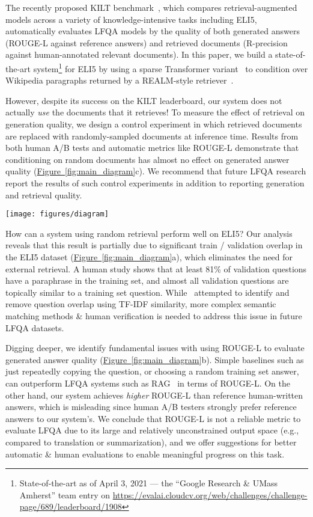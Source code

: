 \documentclass[11pt]{article}
\newcommand{\namedref}[2]{\hyperref[#2]{#1~\ref*{#2}}}
\newcommand{\figureref}[1]{\namedref{Figure}{#1}}
\begin{document}
The recently proposed KILT benchmark~\citep{petroni2020kilt}, which compares retrieval-augmented models across a variety of knowledge-intensive tasks including ELI5, automatically evaluates LFQA models by the quality of both generated answers (ROUGE-L against reference answers) and retrieved documents (R-precision against human-annotated relevant documents). In this paper, we build a state-of-the-art system\footnote{State-of-the-art as of April 3, 2021 --- the ``Google Research \& UMass Amherst'' team entry on \small{\url{https://evalai.cloudcv.org/web/challenges/challenge-page/689/leaderboard/1908}}} for ELI5 by using a sparse Transformer variant~\citep{roy2020efficient} to condition over Wikipedia paragraphs returned by a REALM-style retriever~\citep{guu2020realm}.

However, despite its success on the KILT leaderboard, our system does not actually \emph{use} the documents that it retrieves! To measure the effect of retrieval on generation quality, we design a control experiment in which retrieved documents are replaced with randomly-sampled documents at inference time. Results from both human A/B tests and automatic metrics like ROUGE-L demonstrate that conditioning on random documents has almost no effect on generated answer quality (\figureref{fig:main_diagram}c). We recommend that future LFQA research report the results of such control experiments in addition to reporting generation and retrieval quality.

\begin{figure*}[t]
\texttt{[image: figures/diagram]}
\caption{A summary of the major hurdles (a-d) to progress in long-form question answering with ELI5.}
\label{fig:main_diagram}
\end{figure*}

How can a system using random retrieval perform well on ELI5? Our analysis reveals that this result is partially due to significant train / validation overlap in the ELI5 dataset (\figureref{fig:main_diagram}a), which eliminates the need for external retrieval. A human study shows that at least 81\% of validation questions have a paraphrase in the training set, and almost all validation questions are topically similar to a training set question. While~\citet{fan-etal-2019-eli5} attempted to identify and remove question overlap using TF-IDF similarity, more complex semantic matching methods \& human verification is needed to address this issue in future LFQA datasets.

Digging deeper, we identify fundamental issues with using ROUGE-L to evaluate generated answer quality (\figureref{fig:main_diagram}b). Simple baselines such as just repeatedly copying the question, or choosing a random training set answer, can outperform  LFQA systems such as RAG~\citep{lewis2020retrieval} in terms of ROUGE-L. On the other hand, our system achieves \emph{higher} ROUGE-L than reference human-written answers, which is misleading since human A/B testers strongly prefer reference answers to our system's. We conclude that ROUGE-L is not a reliable metric to evaluate LFQA due to its large and relatively unconstrained output space (e.g., compared to translation or summarization), and we offer suggestions for better automatic \& human evaluations to enable meaningful progress on this task.
\end{document}
